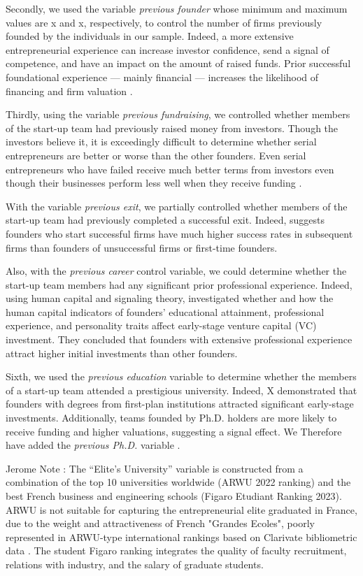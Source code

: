 \documentclass[12pt]{article}
\begin{document}
Secondly, we used the variable \textit{previous founder} whose minimum and maximum values are x and x, respectively, to control the number of firms previously founded by the individuals in our sample. Indeed, a more extensive entrepreneurial experience can increase investor confidence, send a signal of competence, and have an impact on the amount of raised funds. Prior successful foundational experience — mainly financial — increases the likelihood of financing and firm valuation \citep{hsu2007experienced}.

Thirdly, using the variable \textit{previous fundraising}, we controlled whether members of the start-up team had previously raised money from investors. Though the investors believe it, it is exceedingly difficult to determine whether serial entrepreneurs are better or worse than the other founders. Even serial entrepreneurs who have failed receive much better terms from investors even though their businesses perform less well when they receive funding \citep{nahata2019success}.

With the variable \textit{previous exit}, we partially controlled whether members of the start-up team had previously completed a successful exit. Indeed, \citet{gompers2010performance} suggests founders who start successful firms have much higher success rates in subsequent firms than founders of unsuccessful firms or first-time founders.

Also, with the \textit{previous career} control variable, we could determine whether the start-up team members had any significant prior professional experience. Indeed, using human capital and signaling theory,  \citet{subramanian2022backing} investigated whether and how the human capital indicators of founders' educational attainment, professional experience, and personality traits affect early-stage venture capital (VC) investment. They concluded that founders with extensive professional experience attract higher initial investments than other founders.

Sixth, we used the \textit{previous education} variable to determine whether the members of a start-up team attended a prestigious university. Indeed, X demonstrated that founders with degrees from first-plan institutions attracted significant early-stage investments. Additionally, teams founded by Ph.D. holders are more likely to receive funding and higher valuations, suggesting a signal effect. We Therefore have added the \textit{previous Ph.D.} variable \citep{hsu2007experienced}.

Jerome Note : The “Elite’s University” variable is constructed from a combination of the top 10 universities worldwide (ARWU 2022 ranking) and the best French business and engineering schools (Figaro Etudiant Ranking 2023). ARWU is not suitable for capturing the entrepreneurial elite graduated in France, due to the weight and attractiveness of French "Grandes Ecoles", poorly represented in ARWU-type international rankings based on Clarivate bibliometric data . The student Figaro ranking integrates the quality of faculty recruitment, relations with industry, and the salary of graduate students.
\end{document}
